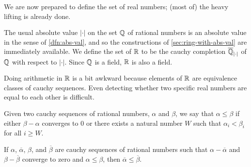 We are now prepared to define the set of real numbers; (most of) the heavy lifting is already done.

\begin{dfn} \label{dfn:real-numbers}
The usual absolute value \(|\cdot|\) on the set \(\mathbb{Q}\) of rational numbers is an absolute value in the sense of \ref{dfn:abs-val}, and so the constructions of \autoref{sec:ring-with-abs-val} are immediately available. We define the set of  \(\mathbb{R}\) to be the cauchy completion \(\overline{\mathbb{Q}}_{|\cdot|}\) of \(\mathbb{Q}\) with respect to \(|\cdot|\). Since \(\mathbb{Q}\) is a field, \(\mathbb{R}\) is also a field.
\end{dfn}

Doing arithmetic in \(\mathbb{R}\) is a bit awkward because elements of \(\mathbb{R}\) are equivalence classes of cauchy sequences. Even detecting whether two specific real numbers are equal to each other is difficult.

\begin{dfn}
Given two cauchy sequences of rational numbers, \(\alpha\) and \(\beta\), we say that \(\alpha \leq \beta\) if either \(\beta - \alpha\) converges to 0 or there exists a natural number \(W\) such that \(\alpha_i < \beta_i\) for all \(i \geq W\).
\end{dfn}

\begin{prop}
If \(\alpha\), \(\overline{\alpha}\), \(\beta\), and \(\overline{\beta}\) are cauchy sequences of rational numbers such that \(\alpha - \overline{\alpha}\) and \(\beta - \overline{\beta}\) converge to zero and \(\alpha \leq \beta\), then \(\overline{\alpha} \leq \overline{\beta}\).
\end{prop}


